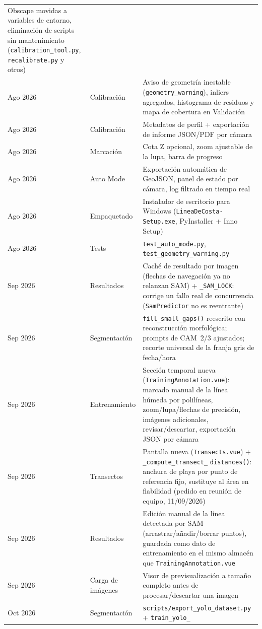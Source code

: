\begin{longtable}{C{2.5cm} L{4cm} L{7cm}}
  Obscape movidas a variables de entorno, eliminación de scripts sin mantenimiento
  (\texttt{calibration\_tool.py}, \texttt{recalibrate.py} y otros) \\
Ago 2026 & Calibración & Aviso de geometría inestable (\texttt{geometry\_warning}), inliers
  agregados, histograma de residuos y mapa de cobertura en Validación \\
Ago 2026 & Calibración & Metadatos de perfil + exportación de informe JSON/PDF por cámara \\
Ago 2026 & Marcación & Cota Z opcional, zoom ajustable de la lupa, barra de progreso \\
Ago 2026 & Auto Mode & Exportación automática de GeoJSON, panel de estado por cámara, log
  filtrado en tiempo real \\
Ago 2026 & Empaquetado & Instalador de escritorio para Windows
  (\texttt{LineaDeCosta-Setup.exe}, PyInstaller + Inno Setup) \\
Ago 2026 & Tests & \texttt{test\_auto\_mode.py}, \texttt{test\_geometry\_warning.py} \\
Sep 2026 & Resultados & Caché de resultado por imagen (flechas de navegación ya no relanzan
  SAM) + \texttt{\_SAM\_LOCK}: corrige un fallo real de concurrencia (\texttt{SamPredictor} no
  es reentrante) \\
Sep 2026 & Segmentación & \texttt{fill\_small\_gaps()} reescrito con reconstrucción morfológica;
  prompts de CAM~2/3 ajustados; recorte universal de la franja gris de fecha/hora \\
Sep 2026 & Entrenamiento & Sección temporal nueva (\texttt{TrainingAnnotation.vue}): marcado
  manual de la línea húmeda por polilíneas, zoom/lupa/flechas de precisión, imágenes
  adicionales, revisar/descartar, exportación JSON por cámara \\
Sep 2026 & Transectos & Pantalla nueva (\texttt{Transects.vue}) + \texttt{\_compute\_transect\_}
  \texttt{distances()}: anchura de playa por punto de referencia fijo, sustituye al área en
  fiabilidad (pedido en reunión de equipo, 11/09/2026) \\
Sep 2026 & Resultados & Edición manual de la línea detectada por SAM (arrastrar/añadir/borrar
  puntos), guardada como dato de entrenamiento en el mismo almacén que
  \texttt{TrainingAnnotation.vue} \\
Sep 2026 & Carga de imágenes & Visor de previsualización a tamaño completo antes de
  procesar/descartar una imagen \\
Oct 2026 & Segmentación & \texttt{scripts/export\_yolo\_dataset.py} + \texttt{train\_yolo\_}

\end{longtable}
